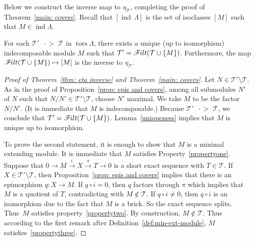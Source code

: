 \documentclass[ALCO,ThmDefs,Unicode,epreuves]{cedram}
\DeclareMathOperator{\tors}{tors}
\DeclareMathOperator{\image}{Im}
\DeclareMathOperator{\ind}{ind}
\newcommand{\calT}{\mathcal{T}}
\newcommand{\filt}{\mathscr{F}\Mk ilt}
\newcommand{\covers}{{\,\,\,\cdot\!\!\!\! >\,\,}}
\renewcommand{\1}{\hat{1}}
\newcommand{\0}{\hat{0}}
\newcommand*{\Mk}{\mkern -2mu}
\begin{document}
Below we construct the inverse map to $\eta_\calT$, completing the proof of Theorem~\ref{main: covers}.
Recall that $[\ind\, \Lambda]$ is the set of isoclasses $[M]$ such that $M\in \ind \Lambda$.
\begin{theorem}\label{thm: eta inverse}
For each $\calT'\covers \calT$ in $\tors\Lambda$, there exists a unique (up to isomorphism) indecomposable module $M$ such that $\calT' = \filt(\calT \cup \{M\})$.
Furthermore, the map $\filt(\calT \cup \{M\}) \mapsto [M]$ is the inverse to $\eta_\calT$.
\end{theorem}
\begin{proof}[Proof of Theorem~\ref{thm: eta inverse} and Theorem~\ref{main: covers}]
Let $N\in \calT' \setminus \calT$.
As in the proof of Proposition~\ref{prop: epis and covers}, among all submodules $N'$ of $N$ such that $N/N'\in \calT'\setminus \calT$, choose $N'$ maximal.
We take $M$ to be the factor~$N/N'$.
(It is immediate that $M$ is indecomposable.)
Because $\calT'\covers \calT$, we conclude that $\calT' = \filt(\calT \cup \{M\})$.
Lemma~\ref{uniqueness} implies that $M$ is unique up to isomorphism.

To prove the second statement, it is enough to show that $M$ is a minimal extending module.
It is immediate that $M$ satisfies Property~\ref{propertyone}.
Suppose that $0\to M \stackrel{i}\rightarrow X\stackrel{\pi}\rightarrow T\rightarrow 0$ is a short exact sequence with $T\in \calT$.
If $X\in \calT'\setminus \calT$, then Proposition~\ref{prop: epis and
 covers} implies that there is an epimorphism $q: X\rightarrow
M$. If $q\circ i=0$, then $q$ factors through $\pi$ which implies that
$M$ is a quotient of $T$, contradicting with $M\notin \calT$. If
$q\circ i\neq 0$, then $q\circ i$ is an isomorphism due to the fact
that $M$ is a brick. So the exact sequence splits.
Thus~$M$ satisfies property~\ref{propertytwo}.
By construction, $M\not\in\calT$. Thus according to the first remark after Definition~\ref{def:min-ext-module}, $M$ satisfies~\ref{propertythree}.
\end{proof}
\end{document}
